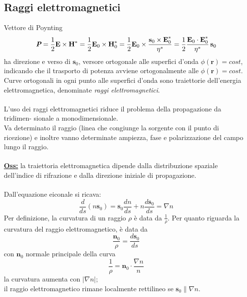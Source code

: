 \documentclass[a4paper]{article}
\begin{document}
\subsection*{Raggi elettromagnetici}
Vettore di Poynting
\begin{equation*}
\emph{\textbf{P}}=\frac{1}{2}\textbf{E}\times\textbf{H}^*=\frac{1}{2}\textbf{E}_0\times\textbf{H}_0^*=\frac{1}{2}\textbf{E}_0\times\frac{\textbf{s}_0\times\textbf{E}_0^*}{\eta^*}=\frac{1}{2}\frac{\textbf{E}_0\cdot\textbf{E}_0^*}{\eta^*}\,\textbf{s}_0
\end{equation*}
ha direzione e verso di $\textbf{s}_0$, versore ortogonale alle superfici d'onda $\phi(\textbf{r})=cost$, indicando che il trasporto di potenza avviene ortogonalmente alle $\phi(\textbf{r})=cost$. Curve ortogonali in ogni punto alle superfici d'onda sono traiettorie dell'energia elettromagnetica, denominate \emph{raggi elettromagnetici}.\\\\
L’uso dei raggi elettromagnetici riduce il problema della propagazione da tridimen-
sionale a monodimensionale.\\
Va determinato il raggio (linea che congiunge la sorgente con il punto di ricezione)
e inoltre vanno determinate ampiezza, fase e polarizzazione del campo lungo il raggio.\\\\
\underline{\textbf{Oss:}} la traiettoria elettromagnetica dipende dalla distribuzione spaziale dell’indice di rifrazione e dalla direzione iniziale di propagazione.\\\\
Dall'equazione eiconale si ricava:
\begin{equation*}
\frac{d}{ds}(n\textbf{s}_0)=\textbf{s}_0\frac{dn}{ds}+n\frac{d\textbf{s}_0}{ds}=\nabla n
\end{equation*}
Per definizione, la curvatura di un raggio $\rho$ è data da $\frac{1}{\rho}$. Per quanto riguarda la curvatura del raggio elettromagnetico, è data da
\begin{equation*}
\frac{\textbf{n}_0}{\rho}=\frac{d\textbf{s}_0}{ds}
\end{equation*}
con $\textbf{n}_0$ normale principale della curva
\begin{equation*}
\frac{1}{\rho}=\textbf{n}_0\cdot\frac{\nabla n}{n}
\end{equation*}
la curvatura aumenta con $|\nabla n|$;\\
il raggio elettromagnetico rimane localmente rettilineo se $\textbf{s}_0\parallel\nabla n$.
\end{document}
